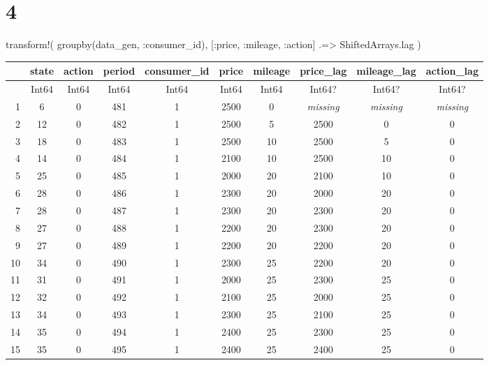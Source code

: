 \documentclass[
  letterpaper,
  DIV=11,
  numbers=noendperiod]{scrreprt}
\newenvironment{Shaded}{\begin{snugshade}}{\end{snugshade}}
\newcommand{\FunctionTok}[1]{\textcolor[rgb]{0.28,0.35,0.67}{#1}}
\newcommand{\NormalTok}[1]{\textcolor[rgb]{0.00,0.23,0.31}{#1}}
\newcommand{\OperatorTok}[1]{\textcolor[rgb]{0.37,0.37,0.37}{#1}}
\begin{document}
\hypertarget{section-27}{%
\section{4}\label{section-27}}

\begin{Shaded}
\begin{Highlighting}[]
\FunctionTok{transform!}\NormalTok{(}
    \FunctionTok{groupby}\NormalTok{(data\_gen, }\OperatorTok{:}\NormalTok{consumer\_id), }
\NormalTok{    [}\OperatorTok{:}\NormalTok{price, }\OperatorTok{:}\NormalTok{mileage, }\OperatorTok{:}\NormalTok{action] }\OperatorTok{.=\textgreater{}}\NormalTok{ ShiftedArrays.lag}
\NormalTok{    )}
\end{Highlighting}
\end{Shaded}

\begin{tabular}{r|ccccccccc}
    & state & action & period & consumer\_id & price & mileage & price\_lag & mileage\_lag & action\_lag\\
    \hline
    & Int64 & Int64 & Int64 & Int64 & Int64 & Int64 & Int64? & Int64? & Int64?\\
    \hline
    1 & 6 & 0 & 481 & 1 & 2500 & 0 & \emph{missing} & \emph{missing} & \emph{missing} \\
    2 & 12 & 0 & 482 & 1 & 2500 & 5 & 2500 & 0 & 0 \\
    3 & 18 & 0 & 483 & 1 & 2500 & 10 & 2500 & 5 & 0 \\
    4 & 14 & 0 & 484 & 1 & 2100 & 10 & 2500 & 10 & 0 \\
    5 & 25 & 0 & 485 & 1 & 2000 & 20 & 2100 & 10 & 0 \\
    6 & 28 & 0 & 486 & 1 & 2300 & 20 & 2000 & 20 & 0 \\
    7 & 28 & 0 & 487 & 1 & 2300 & 20 & 2300 & 20 & 0 \\
    8 & 27 & 0 & 488 & 1 & 2200 & 20 & 2300 & 20 & 0 \\
    9 & 27 & 0 & 489 & 1 & 2200 & 20 & 2200 & 20 & 0 \\
    10 & 34 & 0 & 490 & 1 & 2300 & 25 & 2200 & 20 & 0 \\
    11 & 31 & 0 & 491 & 1 & 2000 & 25 & 2300 & 25 & 0 \\
    12 & 32 & 0 & 492 & 1 & 2100 & 25 & 2000 & 25 & 0 \\
    13 & 34 & 0 & 493 & 1 & 2300 & 25 & 2100 & 25 & 0 \\
    14 & 35 & 0 & 494 & 1 & 2400 & 25 & 2300 & 25 & 0 \\
    15 & 35 & 0 & 495 & 1 & 2400 & 25 & 2400 & 25 & 0 \\

\end{tabular}
\end{document}
